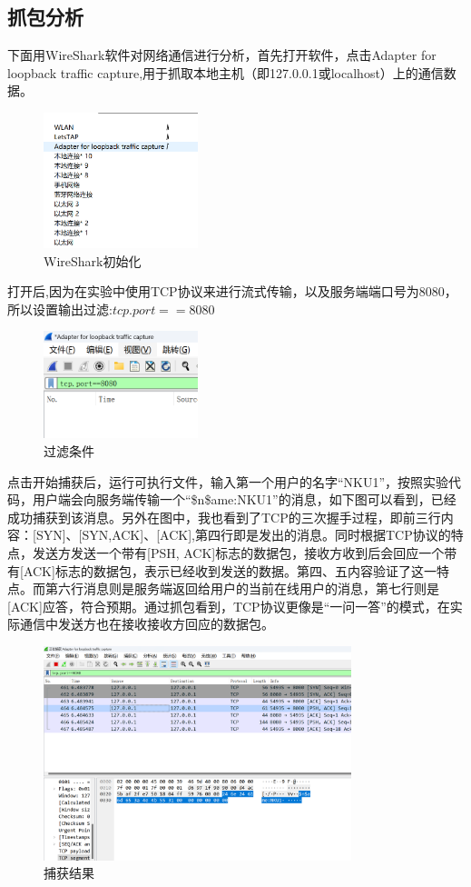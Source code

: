 \documentclass[UTF8,a4paper,10pt]{ctexart}
\begin{document}
\subsection{抓包分析}
下面用WireShark软件对网络通信进行分析，首先打开软件，点击Adapter for loopback traffic capture,用于抓取本地主机（即127.0.0.1或localhost）上的通信数据。
\begin{figure}[H]
    \centering
\includegraphics[width=0.4\textwidth]{img/WireShark初始化.png}
    \caption{WireShark初始化}
\end{figure}
打开后,因为在实验中使用TCP协议来进行流式传输，以及服务端端口号为8080，所以设置输出过滤:$tcp.port==8080$
\begin{figure}[H]
    \centering
\includegraphics[width=0.4\textwidth]{img/过滤条件.png}
    \caption{过滤条件}
\end{figure}
点击开始捕获后，运行可执行文件，输入第一个用户的名字“NKU1”，按照实验代码，用户端会向服务端传输一个“\$n\$ame:NKU1”的消息，如下图可以看到，已经成功捕获到该消息。另外在图中，我也看到了TCP的三次握手过程，即前三行内容：[SYN]、[SYN,ACK]、[ACK],第四行即是发出的消息。同时根据TCP协议的特点，发送方发送一个带有[PSH, ACK]标志的数据包，接收方收到后会回应一个带有[ACK]标志的数据包，表示已经收到发送的数据。第四、五内容验证了这一特点。而第六行消息则是服务端返回给用户的当前在线用户的消息，第七行则是[ACK]应答，符合预期。通过抓包看到，TCP协议更像是“一问一答”的模式，在实际通信中发送方也在接收接收方回应的数据包。
\begin{figure}[H]
    \centering
\includegraphics[width=0.8\textwidth]{img/捕获结果.png}
    \caption{捕获结果}
\end{figure}
\end{document}

